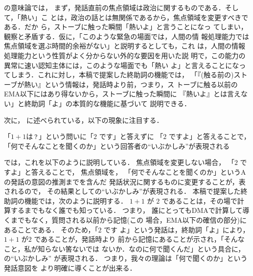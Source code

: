 \cite{kinsui93,kinsui93-3}の意味論では，
まず，発話直前の焦点領域は政治に関するものである．そして，「熱い」こ
とは，政治の話とは無関係であるから，焦点領域を変更すべきである．だか
ら，ストーブに触った瞬間「熱い{\dg よ}」と言うことになっ
てしまい，観察と矛盾する．仮に，「このような緊急の場面では，人間の情
報処理能力では焦点領域を選ぶ時間的余裕がない」と説明するとしても，これ
は，人間の情報処理能力という性質がよく分からない外的な要因を用いた説
明で，この能力の異常に速い認知主体には，このような場面でも「熱い{\dg 
よ}」と言えることになってしまう．これに対し，本稿で提案した終助詞の機能では，
「『(触る前の)ストーブが熱い』という情報は，発話時より前，つまり，ス
トーブに触る以前のEMA以下にはあり得ないから，ストーブに触った瞬間に
『熱い{\dg よ}』とは言えない」と終助詞「よ」の本質的な機能に基づいて
説明できる．

次に，
\cite{kinsui93,kinsui93-3}に述べられている，以下の現象に注目する．
\begin{obserb} \label{1a1}
「\(1 + 1 \)は\verb+？+」という問いに「\(2\) です」と答えずに
「\(2\) です{\dg よ}」と答えることで，
「何でそんなことを聞くのか」という回答者の``いぶかしみ''が表現される
\end{obserb}
\cite{kinsui93,kinsui93-3}では，これを以下のように説明している．
焦点領域を変更しない場合，
「\(2\) です{\dg よ}」と答えることで，
焦点領域を，
「何でそんなことを聞くのか」というAの発話の意図の推測までを含んだ
発話状況に関するものに変更することが，表されるので，
その結果としての``いぶかしみ''が表現される．
本稿で提案した終助詞の機能では，次のように説明する．  \(1 + 1\) が \(2\) 
であることは，その場で計算するまでもなく誰でも知っている．  つまり，
誰にとってもDMAで計算して導くまでもなく，質問される以前から記憶(この
場合，EMA以下の確信の部分)にあることである．  そのため，「\(2\) です{\dg 
よ}」という発話は，終助詞「よ」により，\(1 + 1\) が\(2\) であることが，発話時より
前から記憶にあることが示され，「そんなこと，私が知らない筈ないでは
ないか．なのに何で聞くんだ」という具合に，の``いぶかしみ''
が表現される．  つまり，我々の理論は「何で聞くのか」という発話意図を
より明確に導くことが出来る．

